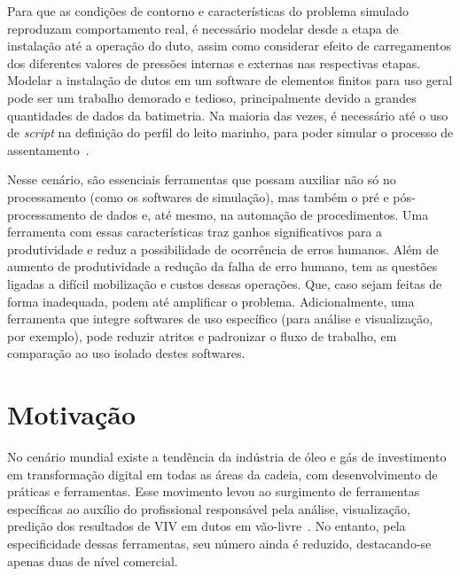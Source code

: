 Para que as condições de contorno e características do problema simulado reproduzam comportamento real, é necessário modelar desde a etapa de instalação até a operação do duto, assim como considerar efeito de carregamentos dos diferentes valores de pressões internas e externas nas respectivas etapas.
Modelar a instalação de dutos em um software de elementos finitos para uso geral pode ser um trabalho demorado e tedioso, principalmente devido a grandes quantidades de dados da batimetria.
Na maioria das vezes, é necessário até o uso de \textit{script} na definição do perfil do leito marinho, para poder simular o processo de assentamento~\cite{VandenAbeele2013}.

Nesse cenário, são essenciais ferramentas que possam auxiliar não só no processamento (como os softwares de simulação), mas também o pré e pós-processamento de dados e, até mesmo, na automação de procedimentos.
Uma ferramenta com essas características traz ganhos significativos para a produtividade e reduz a possibilidade de ocorrência de erros humanos.
Além de aumento de produtividade a redução da falha de erro humano, tem as questões ligadas a difícil mobilização e custos dessas operações. Que, caso sejam feitas de forma inadequada, podem até amplificar o problema.
Adicionalmente, uma ferramenta que integre softwares de uso específico (para análise e visualização, por exemplo), pode reduzir atritos e padronizar o fluxo de trabalho, em comparação ao uso isolado destes softwares.


\section{Motivação}



No cenário mundial existe a tendência da indústria de óleo e gás de investimento em transformação digital em todas as áreas da cadeia, com desenvolvimento de práticas e ferramentas. Esse movimento levou ao surgimento de ferramentas específicas ao auxílio do profissional responsável pela análise, visualização, predição dos resultados de VIV em dutos em vão-livre~\cite{Mittal2017}. No entanto, pela especificidade dessas ferramentas, seu número ainda é reduzido, destacando-se apenas duas de nível comercial.


